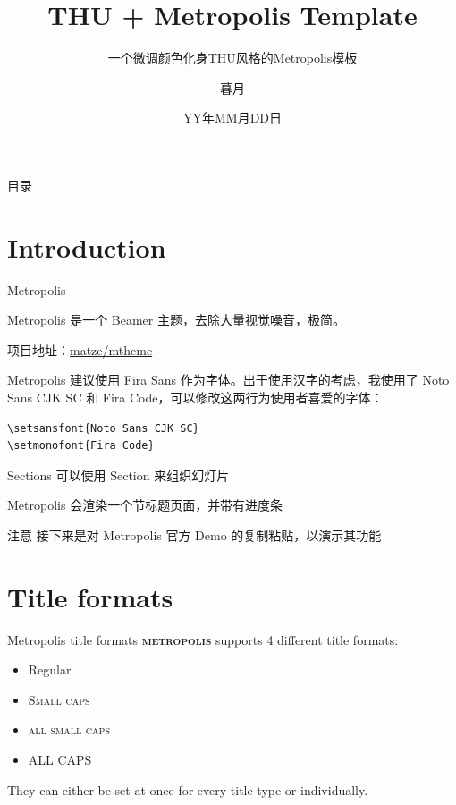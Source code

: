 \documentclass[aspectratio=169]{beamer}
\title{THU + Metropolis Template}
\subtitle{一个微调颜色化身THU风格的Metropolis模板}
\date{YY年MM月DD日}
\author{暮月}
\institute{华清大学}
\newcommand{\themename}{\textbf{\textsc{metropolis}}\xspace}
\begin{document}
\maketitle

\begin{frame}{目录}
    \tableofcontents
\end{frame}

\section{Introduction}

\begin{frame}[fragile]{Metropolis}

    Metropolis 是一个 Beamer 主题，去除大量视觉噪音，极简。

    项目地址：\href{https://github.com/matze/mtheme}{matze/mtheme}

    Metropolis 建议使用 Fira Sans 作为字体。出于使用汉字的考虑，我使用了 Noto Sans CJK SC 和 Fira Code，可以修改这两行为使用者喜爱的字体：

    \begin{verbatim}
\setsansfont{Noto Sans CJK SC}
\setmonofont{Fira Code}
    \end{verbatim}
\end{frame}

\begin{frame}[fragile]{Sections}
    可以使用 Section 来组织幻灯片

    Metropolis 会渲染一个节标题页面，并带有进度条

    \begin{alertblock}{注意}
        接下来是对 Metropolis 官方 Demo 的复制粘贴，以演示其功能
    \end{alertblock}
\end{frame}

\section{Title formats}

\begin{frame}{Metropolis title formats}
    \themename supports 4 different title formats:
    \begin{itemize}
        \item Regular
        \item \textsc{Small caps}
        \item \textsc{all small caps}
        \item ALL CAPS
    \end{itemize}
    They can either be set at once for every title type or individually.
\end{frame}
\end{document}
